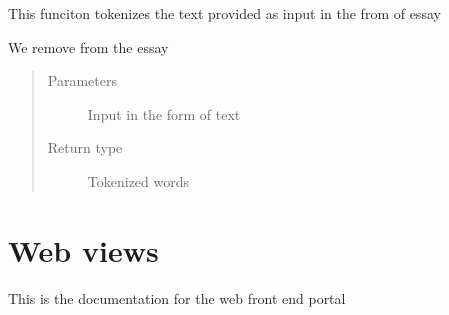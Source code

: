 \documentclass[letterpaper,10pt,english]{sphinxmanual}
\begin{document}

\begin{fulllineitems}
\label{\detokenize{prediction:prediction.tokenizeEssay}}
This funciton tokenizes the text provided as input in the from of essay

We remove  from the essay

\begin{sphinxVerbatim}[commandchars=\\\{\}]
  
\end{sphinxVerbatim}
\begin{quote}\begin{description}
\item[{Parameters}] \leavevmode
{} \textendash{} Input in the form of text

\item[{Return type}] \leavevmode
Tokenized words

\end{description}\end{quote}

\end{fulllineitems}



\section{Web views}
\label{\detokenize{web:web-views}}\label{\detokenize{web::doc}}
This is the documentation for the web front end portal


\begin{figure}[htbp]
\centering

\noindent{}
\end{figure}


\begin{figure}[htbp]
\centering

\noindent{}
\end{figure}
\end{document}

